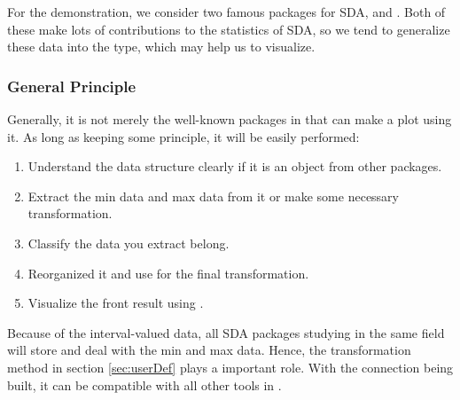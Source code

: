 \documentclass[article]{jss}
\begin{document}
For the demonstration, we consider two famous  packages for SDA,  \cite{HistDAWass} and  \cite{MAINT.Data}. Both of these make lots of contributions to the statistics of SDA, so we tend to generalize these data into the  type, which may help us to visualize.

\subsubsection{General Principle}\label{sec:genPrin}

Generally, it is not merely the well-known packages in  that can make a plot using it. As long as keeping some principle, it will be easily performed:

\begin{enumerate}
  \item Understand the data structure clearly if it is an object from other packages.
  \item Extract the min data and max data from it or make some necessary transformation.
  \item Classify the data you extract belong.
  \item Reorganized it and use  for the final transformation.
  \item Visualize the front result using .
\end{enumerate}

Because of the interval-valued data, all SDA packages studying in the same field will store and deal with the min and max data. Hence, the transformation method in section \ref{sec:userDef} plays a important role. With the connection being built, it can be compatible with all other tools in .


\subsubsection[HistDAWass]{}
\end{document}

